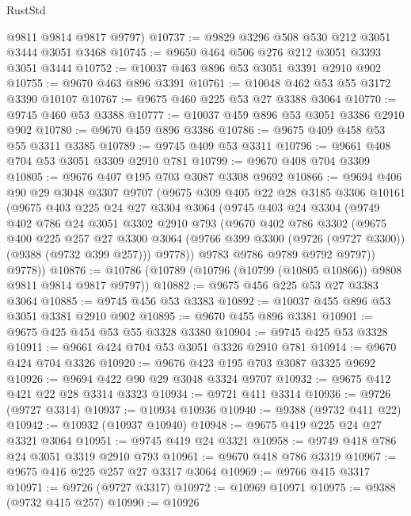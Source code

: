 \begin{lexlean}{RustStd}
\begin{coremodule}
      @9811
      @9814
      @9817
      @9797)
@10737 := @9829 @3296 @508 @530 @212 @3051 @3444 @3051 @3468
@10745 := @9650 @464 @506 @276 @212 @3051 @3393 @3051 @3444
@10752 := @10037 @463 @896 @53 @3051 @3391 @2910 @902
@10755 := @9670 @463 @896 @3391
@10761 := @10048 @462 @53 @55 @3172 @3390 @10107
@10767 := @9675 @460 @225 @53 @27 @3388 @3064
@10770 := @9745 @460 @53 @3388
@10777 := @10037 @459 @896 @53 @3051 @3386 @2910 @902
@10780 := @9670 @459 @896 @3386
@10786 := @9675 @409 @458 @53 @55 @3311 @3385
@10789 := @9745 @409 @53 @3311
@10796 := @9661 @408 @704 @53 @3051 @3309 @2910 @781
@10799 := @9670 @408 @704 @3309
@10805 := @9676 @407 @195 @703 @3087 @3308 @9692
@10866 := @9694
    @406
    @90
    @29
    @3048
    @3307
    @9707
    (@9675
      @309
      @405
      @22
      @28
      @3185
      @3306
      @10161
      (@9675
        @403
        @225
        @24
        @27
        @3304
        @3064
        (@9745
          @403
          @24
          @3304
          (@9749
            @402
            @786
            @24
            @3051
            @3302
            @2910
            @793
            (@9670
              @402
              @786
              @3302
              (@9675
                @400
                @225
                @257
                @27
                @3300
                @3064
                (@9766 @399 @3300 (@9726 (@9727 @3300)) (@9388 (@9732 @399 @257)))
                @9778))
            @9783
            @9786
            @9789
            @9792
            @9797))
        @9778))
@10876 := @10786 (@10789 (@10796 (@10799 (@10805 @10866)) @9808 @9811 @9814 @9817 @9797))
@10882 := @9675 @456 @225 @53 @27 @3383 @3064
@10885 := @9745 @456 @53 @3383
@10892 := @10037 @455 @896 @53 @3051 @3381 @2910 @902
@10895 := @9670 @455 @896 @3381
@10901 := @9675 @425 @454 @53 @55 @3328 @3380
@10904 := @9745 @425 @53 @3328
@10911 := @9661 @424 @704 @53 @3051 @3326 @2910 @781
@10914 := @9670 @424 @704 @3326
@10920 := @9676 @423 @195 @703 @3087 @3325 @9692
@10926 := @9694 @422 @90 @29 @3048 @3324 @9707
@10932 := @9675 @412 @421 @22 @28 @3314 @3323
@10934 := @9721 @411 @3314
@10936 := @9726 (@9727 @3314)
@10937 := @10934 @10936
@10940 := @9388 (@9732 @411 @22)
@10942 := @10932 (@10937 @10940)
@10948 := @9675 @419 @225 @24 @27 @3321 @3064
@10951 := @9745 @419 @24 @3321
@10958 := @9749 @418 @786 @24 @3051 @3319 @2910 @793
@10961 := @9670 @418 @786 @3319
@10967 := @9675 @416 @225 @257 @27 @3317 @3064
@10969 := @9766 @415 @3317
@10971 := @9726 (@9727 @3317)
@10972 := @10969 @10971
@10975 := @9388 (@9732 @415 @257)
@10990 := @10926

\end{coremodule}
\end{lexlean}
